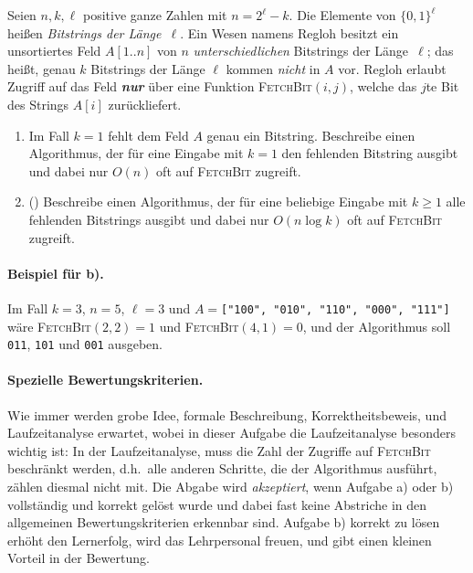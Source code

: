 \documentclass{uebung_cs}
\begin{document}
	Seien $n,k,\ell$ positive ganze Zahlen mit $n=2^\ell-k$.
    Die Elemente von $\{0,1\}^\ell$ heißen \emph{Bitstrings der Länge~$\ell$}.
    Ein Wesen namens Regloh besitzt ein unsortiertes Feld $A[1..n]$ von $n$ \emph{unterschiedlichen} Bitstrings der Länge~$\ell$; das heißt, genau $k$ Bitstrings der Länge $\ell$ kommen \emph{nicht} in $A$ vor.
    Regloh erlaubt Zugriff auf das Feld \emph{\textbf{nur}} über eine Funktion \textsc{FetchBit}$(i,j)$, welche das $j$te Bit des Strings $A[i]$ zurückliefert.
    \begin{enumerate}
        \item Im Fall $k=1$ fehlt dem Feld $A$ genau ein Bitstring. Beschreibe einen Algorithmus, der für eine Eingabe mit $k=1$ den fehlenden Bitstring ausgibt und dabei nur $O(n)$ oft auf \textsc{FetchBit} zugreift.
        \item (\hard) Beschreibe einen Algorithmus, der für eine beliebige Eingabe mit $k\ge 1$ alle fehlenden Bitstrings ausgibt und dabei nur $O(n\log k)$ oft auf \textsc{FetchBit} zugreift.
    \end{enumerate}

    \paragraph{Beispiel für b).}
    Im Fall $k=3$, $n=5$, $\ell=3$ und $A=$\texttt{["100", "010", "110", "000", "111"]}
    wäre \textsc{FetchBit}$(2,2)=1$ und \textsc{FetchBit}$(4,1)=0$, und der Algorithmus soll \texttt{011}, \texttt{101} und \texttt{001} ausgeben.

\paragraph{Spezielle Bewertungskriterien.}
Wie immer werden grobe Idee, formale Beschreibung, Korrektheitsbeweis, und Laufzeitanalyse erwartet, wobei in dieser Aufgabe die Laufzeitanalyse besonders wichtig ist: In der Laufzeitanalyse, muss die Zahl der Zugriffe auf \textsc{FetchBit} beschränkt werden, d.h.\ alle anderen Schritte, die der Algorithmus ausführt, zählen diesmal nicht mit.
Die Abgabe wird \emph{akzeptiert}, wenn Aufgabe a) oder b) vollständig und korrekt gelöst wurde und dabei fast keine Abstriche in den allgemeinen Bewertungskriterien erkennbar sind. Aufgabe b) korrekt zu lösen erhöht den Lernerfolg, wird das Lehrpersonal freuen, und gibt einen kleinen Vorteil in der Bewertung.


\end{document}
